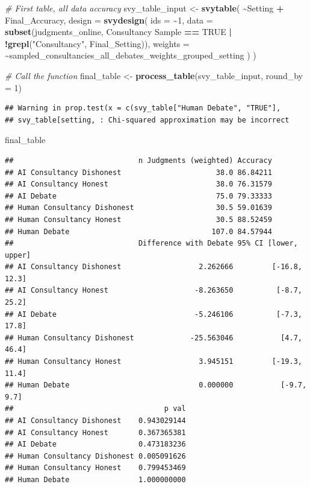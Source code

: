 \documentclass[
]{article}
\newenvironment{Shaded}{\begin{snugshade}}{\end{snugshade}}
\newcommand{\AttributeTok}[1]{\textcolor[rgb]{0.13,0.29,0.53}{#1}}
\newcommand{\CommentTok}[1]{\textcolor[rgb]{0.56,0.35,0.01}{\textit{#1}}}
\newcommand{\ConstantTok}[1]{\textcolor[rgb]{0.56,0.35,0.01}{#1}}
\newcommand{\DecValTok}[1]{\textcolor[rgb]{0.00,0.00,0.81}{#1}}
\newcommand{\FunctionTok}[1]{\textcolor[rgb]{0.13,0.29,0.53}{\textbf{#1}}}
\newcommand{\NormalTok}[1]{#1}
\newcommand{\OtherTok}[1]{\textcolor[rgb]{0.56,0.35,0.01}{#1}}
\newcommand{\SpecialCharTok}[1]{\textcolor[rgb]{0.81,0.36,0.00}{\textbf{#1}}}
\newcommand{\StringTok}[1]{\textcolor[rgb]{0.31,0.60,0.02}{#1}}
\begin{document}
\begin{Shaded}
\begin{Highlighting}[]
\CommentTok{\# First table, all data accuracy}
\NormalTok{svy\_table\_input }\OtherTok{\textless{}{-}} \FunctionTok{svytable}\NormalTok{(}
  \SpecialCharTok{\textasciitilde{}}\NormalTok{Setting }\SpecialCharTok{+}\NormalTok{ Final\_Accuracy, }
  \AttributeTok{design =} \FunctionTok{svydesign}\NormalTok{(}
    \AttributeTok{ids =} \SpecialCharTok{\textasciitilde{}}\DecValTok{1}\NormalTok{, }
    \AttributeTok{data =} \FunctionTok{subset}\NormalTok{(judgments\_online, }\StringTok{\textasciigrave{}}\AttributeTok{Consultancy Sample}\StringTok{\textasciigrave{}} \SpecialCharTok{==} \ConstantTok{TRUE} \SpecialCharTok{|} \SpecialCharTok{!}\FunctionTok{grepl}\NormalTok{(}\StringTok{"Consultancy"}\NormalTok{, Final\_Setting)),}
    \AttributeTok{weights =} \SpecialCharTok{\textasciitilde{}}\NormalTok{sampled\_consultancies\_all\_debates\_weights\_grouped\_setting}
\NormalTok{  )}
\NormalTok{)}

\CommentTok{\# Call the function}
\NormalTok{final\_table }\OtherTok{\textless{}{-}} \FunctionTok{process\_table}\NormalTok{(svy\_table\_input, }\AttributeTok{round\_by =} \DecValTok{1}\NormalTok{)}
\end{Highlighting}
\end{Shaded}

\begin{verbatim}
## Warning in prop.test(x = c(svy_table["Human Debate", "TRUE"],
## svy_table[setting, : Chi-squared approximation may be incorrect
\end{verbatim}

\begin{Shaded}
\begin{Highlighting}[]
\NormalTok{final\_table}
\end{Highlighting}
\end{Shaded}

\begin{verbatim}
##                             n Judgments (weighted) Accuracy
## AI Consultancy Dishonest                      38.0 86.84211
## AI Consultancy Honest                         38.0 76.31579
## AI Debate                                     75.0 79.33333
## Human Consultancy Dishonest                   30.5 59.01639
## Human Consultancy Honest                      30.5 88.52459
## Human Debate                                 107.0 84.57944
##                             Difference with Debate 95% CI [lower, upper]
## AI Consultancy Dishonest                  2.262666         [-16.8, 12.3]
## AI Consultancy Honest                    -8.263650          [-8.7, 25.2]
## AI Debate                                -5.246106          [-7.3, 17.8]
## Human Consultancy Dishonest             -25.563046           [4.7, 46.4]
## Human Consultancy Honest                  3.945151         [-19.3, 11.4]
## Human Debate                              0.000000           [-9.7, 9.7]
##                                   p val
## AI Consultancy Dishonest    0.943029144
## AI Consultancy Honest       0.367365381
## AI Debate                   0.473183236
## Human Consultancy Dishonest 0.005091626
## Human Consultancy Honest    0.799453469
## Human Debate                1.000000000
\end{verbatim}
\end{document}

